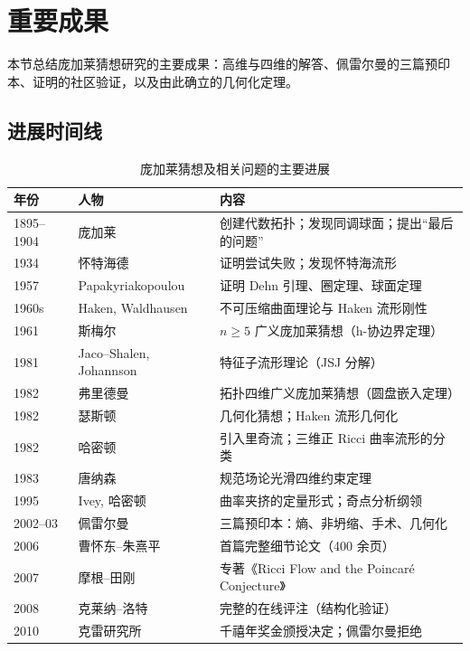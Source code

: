 \section{重要成果}\label{sec:results}

本节总结庞加莱猜想研究的主要成果：高维与四维的解答、佩雷尔曼的三篇预印本、证明的社区验证，以及由此确立的几何化定理。

\subsection{进展时间线}

\begin{table}[htbp]
    \centering
    \caption{庞加莱猜想及相关问题的主要进展}
    \label{tab:timeline}
    \begin{tabular}{llp{7.8cm}}
        \toprule
        年份 & 人物 & 内容 \\
        \midrule
        1895--1904 & 庞加莱 & 创建代数拓扑；发现同调球面；提出“最后的问题” \\
        1934 & 怀特海德 & 证明尝试失败；发现怀特海流形 \\
        1957 & Papakyriakopoulou & 证明 Dehn 引理、圈定理、球面定理 \\
        1960s & Haken, Waldhausen & 不可压缩曲面理论与 Haken 流形刚性 \\
        1961 & 斯梅尔 & $n \geq 5$ 广义庞加莱猜想（h-协边界定理） \\
        1981 & Jaco--Shalen, Johannson & 特征子流形理论（JSJ 分解） \\
        1982 & 弗里德曼 & 拓扑四维广义庞加莱猜想（圆盘嵌入定理） \\
        1982 & 瑟斯顿 & 几何化猜想；Haken 流形几何化 \\
        1982 & 哈密顿 & 引入里奇流；三维正 Ricci 曲率流形的分类 \\
        1983 & 唐纳森 & 规范场论光滑四维约束定理 \\
        1995 & Ivey, 哈密顿 & 曲率夹挤的定量形式；奇点分析纲领 \\
        2002--03 & 佩雷尔曼 & 三篇预印本：熵、非坍缩、手术、几何化 \\
        2006 & 曹怀东--朱熹平 & 首篇完整细节论文（400 余页） \\
        2007 & 摩根--田刚 & 专著《Ricci Flow and the Poincar\'e Conjecture》 \\
        2008 & 克莱纳--洛特 & 完整的在线评注（结构化验证） \\
        2010 & 克雷研究所 & 千禧年奖金颁授决定；佩雷尔曼拒绝 \\
        \bottomrule
    \end{tabular}
\end{table}

